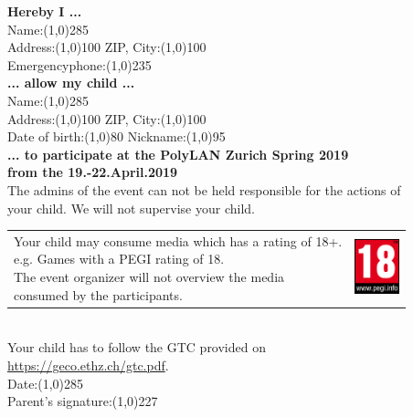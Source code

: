 \documentclass{article}
\begin{document}
\textbf{Hereby I ...}\\
\vspace{0.5cm}
Name:\line(1,0){285}\\
\vspace{0.5cm}
Address:\line(1,0){100}\hspace{1cm} ZIP, City:\line(1,0){100}\\
\vspace{0.5cm}
Emergencyphone:\line(1,0){235} \\
\vspace{0.5cm}
\textbf{... allow my child ...}\\
\vspace{0.5cm}
Name:\line(1,0){285}\\
\vspace{0.5cm}
Address:\line(1,0){100}\hspace{1cm} ZIP, City:\line(1,0){100}\\
\vspace{0.5cm}
Date of birth:\line(1,0){80}\hspace{1cm} Nickname:\line(1,0){95}\\
\vspace{0.5cm}
\textbf{... to participate at the PolyLAN Zurich Spring 2019\\from the 19.-22.April.2019}\\
\vspace{0.5cm}
The admins of the event can not be held responsible for the actions of\\your child.
We will not supervise your child.\\
\vspace{0.2cm}
\begin{tabular}{@{}l l@{}}
\shortstack[l]{Your child may consume media which has a rating of 18+. \\e.g. Games with a PEGI rating of 18.\\The event organizer will not overview the media\\ consumed by the participants.} & \includegraphics[width=1.3cm]{pegi18.png}
\end{tabular}
\vspace{0.5cm}
\\
Your child has to follow the GTC provided on\\\url{https://geco.ethz.ch/gtc.pdf}.
\vspace{1cm}
\\
Date:\line(1,0){285} \\
\vspace{0.5cm}
Parent's signature:\line(1,0){227} \\

\end{document}
